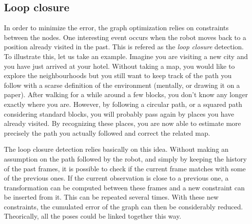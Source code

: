 \clearpage
\subsection{Loop closure}

In order to minimize the error, the graph optimization relies on constraints between the nodes. One interesting event occurs when the robot moves back to a position already visited in the past. This is refered as the \emph{loop closure} detection. To illustrate this, let us take an example. Imagine you are visiting a new city and you have just arrived at your hotel. Without taking a map, you would like to explore the neighbourhoods but you still want to keep track of the path you follow with a scarse definition of the environment (mentally, or drawing it on a paper). After walking for a while around a few blocks, you don't know any longer exactly where you are. However, by following a circular path, or a squared path considering standard blocks, you will probably pass again by places you have already visited. By recognizing these places, you are now able to estimate more precisely the path you actually followed and correct the related map.

The loop closure detection relies basically on this idea. Without making an assumption on the path followed by the robot, and simply by keeping the history of the past frames, it is possible to check if the current frame matches with some of the previous ones. If the current observation is close to a previous one, a transformation can be computed between these frames and a new constraint can be inserted from it. This can be repeated several times. With these new constraints, the cumulated error of the graph can then be considerably reduced. Theorically, all the poses could be linked together this way. 

